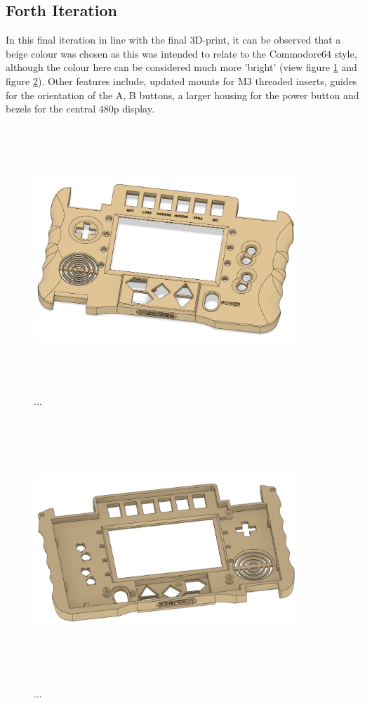 \subsection{Forth Iteration}

In this final iteration in line with the final 3D-print, it can be observed that a beige colour was chosen as this was intended to relate to the Commodore64 style, although the colour here can be considered much more 'bright' (view figure \ref{fig:iteration4_t_f} and figure \ref{fig:iteration4_t_b}).
Other features include, updated mounts for M3 threaded inserts, guides for the orientation of the A, B buttons, a larger housing for the power button and bezels for the central 480p display.

\begin{figure} [h]
    \centering
    \includegraphics[width=10cm,height=10cm,keepaspectratio]{Figures/iteration4_top_front.png}
    \caption{...}
    \label{fig:iteration4_t_f}
\end{figure}

\begin{figure} [h]
    \centering
    \includegraphics[width=10cm,height=10cm,keepaspectratio]{Figures/iteration4_top_back.png}
    \caption{...}
    \label{fig:iteration4_t_b}
\end{figure}

